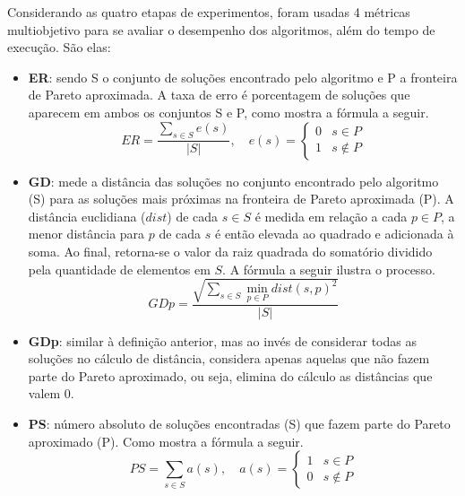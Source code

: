 Considerando as quatro etapas de experimentos, foram usadas 4 métricas multiobjetivo para se avaliar o desempenho dos algoritmos, além do tempo de execução. São elas:

\begin{itemize}
	\item \textbf{\ac{ER}}: sendo S o conjunto de soluções encontrado pelo algoritmo e P a fronteira de Pareto aproximada. A taxa de erro é porcentagem de soluções que aparecem em ambos os conjuntos S e P, como mostra a fórmula a seguir.
	\begin{equation}
		ER = \frac{\sum\limits_{s \in S} e(s)}{|S|}, \quad
		e(s) = 
		\begin{cases} 
			0 & s \in P \\
			1 & s \notin P
		\end{cases}
	\end{equation}
	\item \textbf{\ac{GD}}: mede a distância das soluções no conjunto encontrado pelo algoritmo (S) para as soluções mais próximas na fronteira de Pareto aproximada (P). A distância euclidiana ($dist$) de cada $s \in S$ é medida em relação a cada $p \in P$, a menor distância para $p$ de cada $s$ é então elevada ao quadrado e adicionada à soma. Ao final, retorna-se o valor da raiz quadrada do somatório dividido pela quantidade de elementos em $S$. A fórmula a seguir ilustra o processo.
	\begin{equation}GDp = \frac{\sqrt{\sum\limits_{s \in S} \min\limits_{p \in P} dist(s, p)^2}}{|S|}\end{equation}
	\item \textbf{\ac{GDp}}: similar à definição anterior, mas ao invés de considerar todas as soluções no cálculo de distância, considera apenas aquelas que não fazem parte do Pareto aproximado, ou seja, elimina do cálculo as distâncias que valem 0.
	\item \textbf{\ac{PS}}: número absoluto de soluções encontradas (S) que fazem parte do Pareto aproximado (P). Como mostra a fórmula a seguir.
	\begin{equation}
		PS = \sum\limits_{s \in S} a(s), \quad
		a(s) = 
		\begin{cases} 
			1 & s \in P \\
			0 & s \notin P
		\end{cases}
	\end{equation}

\end{itemize}

